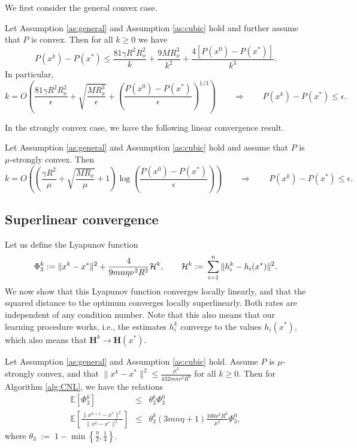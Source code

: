 \documentclass[10pt]{article}
\newcommand{\eqdef}{\; { := }\;}
\newcommand{\newalpha}{h}
\newcommand{\mH}{\mathbf{H}}
\begin{document}
We first consider the general convex case. 

\begin{theorem}\label{th:concubic}
	Let Assumption \ref{as:general} and Assumption \ref{as:cubic} hold and further assume that $P$ is convex. Then for all $k\geq 0$ we have 
	\[
	P(x^k) - P(x^*) 
	\leq \frac{81\gamma R^2 R_x^2}{k} + \frac{9MR_x^3}{k^2} + \frac{4[P(x^0) - P(x^*)]}{k^3}.
	\]  In particular,  
	$$
	k = O\left( \frac{81\gamma R^2 R_x^2}{\epsilon}  + \sqrt{\frac{MR_x^3}{\epsilon}} + \left(  \frac{P(x^0) - P(x^*)}{\epsilon}  \right)^{1/3}   \right) \qquad \Rightarrow \qquad P(x^k) - P(x^*) \leq \epsilon.
	$$
\end{theorem}


In the strongly convex case, we have the following linear convergence result. 

\begin{theorem}\label{th:stronglyconcubic}
	Let Assumption \ref{as:general} and Assumption \ref{as:cubic} hold and assume that $P$ is $\mu$-strongly convex. Then 	$$
	k = O\left( \left(  \frac{\gamma R^2}{\mu} + \sqrt{\frac{MR_x}{\mu}} + 1 \right) \log \left(  \frac{P(x^0) - P(x^*)}{\epsilon}  \right)   \right) \qquad \Rightarrow \qquad P(x^k) - P(x^*) \leq \epsilon.
	$$
\end{theorem}






\subsection{Superlinear convergence}


Let us define the Lyapunov function 
$$
\Phi_3^k \eqdef \|x^{k} - x^*\|^2 + \frac{4}{9mn\eta  \nu^2 R^2} {\cal H}^{k}, \qquad {\cal H}^k \eqdef  \sum_{i=1}^n \|h_i^k - \newalpha_i(x^*)\|^2.
$$
We now show that this Lyapunov function converges locally linearly, and that the squared distance to the optimum converges locally superlinearly. Both rates are independent of any condition number. Note that this also means that our learning procedure works, i.e., the estimates $h_i^k$ converge to the values $\newalpha_i(x^*)$, which also means that $\mH^k \to \mH(x^*)$. 

\begin{theorem}\label{th:cubicsup}
	Let Assumption \ref{as:general} and Assumption \ref{as:cubic} hold. Assume $P$ is $\mu$-strongly convex, and that $\|x^k - x^*\|^2 \leq \frac{\mu^2}{432m n \nu^2R^6}$ for all $k\geq 0$. Then for Algorithm \ref{alg:CNL}, we have the relations
\begin{eqnarray*}
	\mathbb{E} \left[\Phi_3^k \right] & \leq &  \theta_3^k \Phi_3^0 \\
		\mathbb{E} \left[  \frac{\|x^{k+1} - x^*\|^2}{\|x^k - x^*\|^2 }  \right]	&	\leq & \theta_3^k  \left(  {3m n\eta} + 1  \right) \frac{100\nu^2 R^6}{\mu^2} \Phi_3^0, 
	\end{eqnarray*}
	where $\theta_3 \eqdef  1 - \min \left\{  \frac{\eta}{2}, \frac{1}{4}  \right\}$.
\end{theorem}
\end{document}
